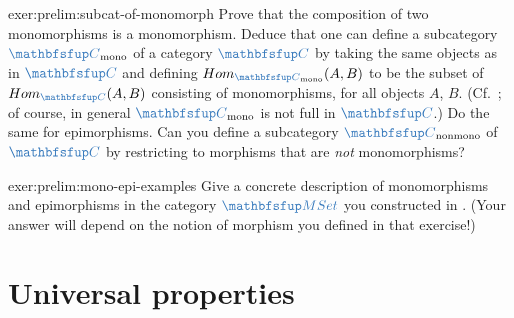 \begin{exer}{}{exer:prelim:subcat-of-monomorph}
  Prove that the composition of two monomorphisms is a
  monomorphism. Deduce that one can define a subcategory
  $\categ{C}_{\mathrm{mono}}$ of a category $\categ{C}$ by taking the
  same objects as in $\categ{C}$ and defining
  $\Hom_{\categ{C}_{\mathrm{mono}}}(A,B)$ to be the subset of
  $\Hom_{\categ{C}}(A,B)$ consisting of monomorphisms, for all objects
  $A$, $B$. (Cf.\ ; of course, in general
  $\categ{C}_{\mathrm{mono}}$ is not full in $\categ{C}$.) Do the same
  for epimorphisms. Can you define a subcategory
  $\categ{C}_{\mathrm{nonmono}}$ of $\categ{C}$ by restricting to
  morphisms that are \emph{not} monomorphisms?
\end{exer}

\begin{exer}{}{exer:prelim:mono-epi-examples}
  Give a concrete description of monomorphisms and epimorphisms in the
  category $\categ{MSet}$ you constructed in
  . (Your answer will depend on the
  notion of morphism you defined in that exercise!)
\end{exer}

\section{Universal properties}%
\label{sec:prelims:universal-properties}

